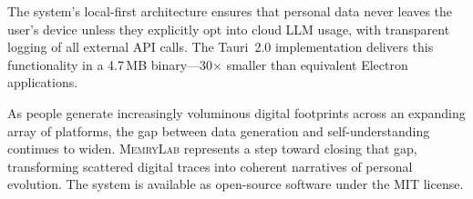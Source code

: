 \documentclass[manuscript,review]{acmart}
\begin{document}
The system's local-first architecture ensures that personal data never leaves the user's device unless they explicitly opt into cloud LLM usage, with transparent logging of all external API calls.
The Tauri~2.0 implementation delivers this functionality in a 4.7\,MB binary---30$\times$ smaller than equivalent Electron applications.

As people generate increasingly voluminous digital footprints across an expanding array of platforms, the gap between data generation and self-understanding continues to widen.
\textsc{MemryLab} represents a step toward closing that gap, transforming scattered digital traces into coherent narratives of personal evolution.
The system is available as open-source software under the MIT license.



\end{document}
